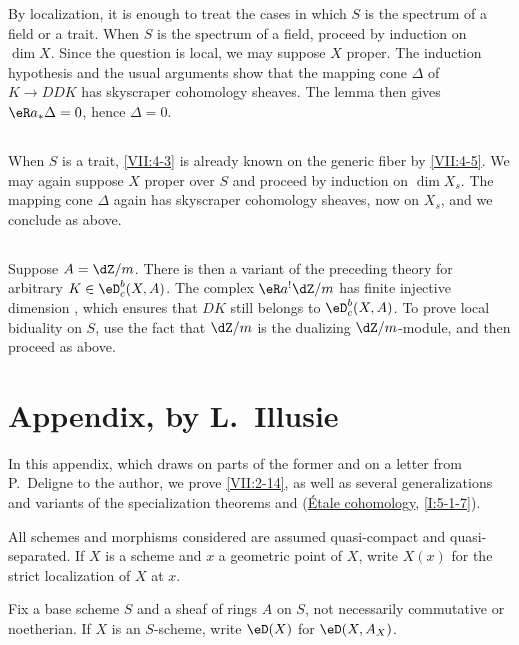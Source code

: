 \documentclass[12pt,oneside,english]{smfbook}
\begin{document}
By localization, it is enough to treat the cases in which $S$ is the spectrum of a field or a trait. When $S$ is the spectrum of a field, proceed by induction on $\dim X$. Since the question is local, we may suppose $X$ proper. The induction hypothesis and the usual arguments show that the mapping cone $\Delta$ of $K\to DDK$ has skyscraper cohomology sheaves. The lemma then gives $\eR a_\ast\Delta=0$, hence $\Delta=0$.

\subsection{}\label{VII:4-6}

When $S$ is a trait, \ref{VII:4-3} is already known on the generic fiber by \ref{VII:4-5}. We may again suppose $X$ proper over $S$ and proceed by induction on $\dim X_s$. The mapping cone $\Delta$ again has skyscraper cohomology sheaves, now on $X_s$, and we conclude as above.

\subsection{}\label{VII:4-7}

Suppose $A=\dZ/m$. There is then a variant of the preceding theory for arbitrary $K\in\eD_c^b(X,A)$. The complex $\eR a^!\dZ/m$ has finite injective dimension \cite[XVIII, 3.1.7]{sga4}, which ensures that $DK$ still belongs to $\eD_c^b(X,A)$. To prove local biduality on $S$, use the fact that $\dZ/m$ is the dualizing $\dZ/m$-module, and then proceed as above.

\section{Appendix, by L.\ Illusie}\label{VII:5}

In this appendix, which draws on parts of the former \cite[II]{sga5} and on a letter from P.\ Deligne to the author, we prove \ref{VII:2-14}, as well as several generalizations and variants of the specialization theorems \cite[XVI, 2.1]{sga4} and (\hyperref[I]{Étale cohomology}, \ref{I:5-1-7}).

All schemes and morphisms considered are assumed quasi-compact and quasi-separated. If $X$ is a scheme and $x$ a geometric point of $X$, write $X(x)$ for the strict localization of $X$ at $x$.

Fix a base scheme $S$ and a sheaf of rings $A$ on $S$, not necessarily commutative or noetherian. If $X$ is an $S$-scheme, write $\eD(X)$ for $\eD(X,A_X)$.
\end{document}
